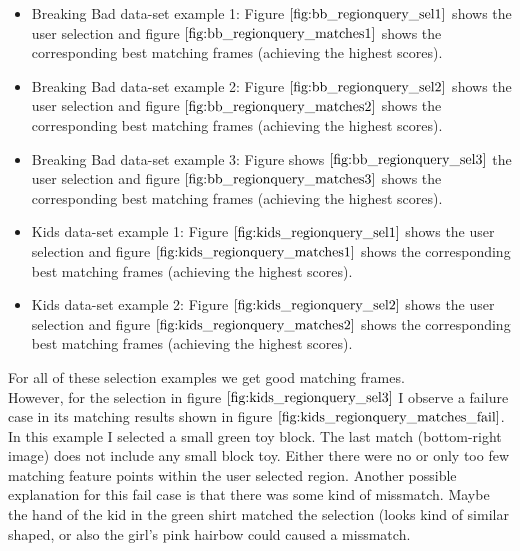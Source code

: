 \documentclass{paper}
\begin{document}
\begin{itemize}
    \item Breaking Bad data-set example 1: Figure $\ref{fig:bb_regionquery_sel1}$ shows the user selection and figure $\ref{fig:bb_regionquery_matches1}$ shows the corresponding best matching frames (achieving the highest scores).
    \item Breaking Bad data-set example 2: Figure $\ref{fig:bb_regionquery_sel2}$ shows the user selection and figure $\ref{fig:bb_regionquery_matches2}$ shows the corresponding best matching frames (achieving the highest scores).
    \item Breaking Bad data-set example 3: Figure shows $\ref{fig:bb_regionquery_sel3}$ the user selection and figure $\ref{fig:bb_regionquery_matches3}$ shows the corresponding best matching frames (achieving the highest scores).
    \item Kids data-set example 1: Figure $\ref{fig:kids_regionquery_sel1}$ shows the user selection and figure $\ref{fig:kids_regionquery_matches1}$ shows the corresponding best matching frames (achieving the highest scores).
    \item Kids data-set example 2: Figure $\ref{fig:kids_regionquery_sel2}$ shows the user selection and figure $\ref{fig:kids_regionquery_matches2}$ shows the corresponding best matching frames (achieving the highest scores).     
\end{itemize}

For all of these selection examples we get good matching frames. \\

However, for the selection in figure $\ref{fig:kids_regionquery_sel3}$ I observe a failure case in its matching results shown in figure $\ref{fig:kids_regionquery_matches_fail}$. In this example I selected a small green toy block. The last match (bottom-right image) does not include any small block toy. Either there were no or only too few matching feature points within the user selected region. Another possible explanation for this fail case is that there was some kind of missmatch. Maybe  the hand of the kid in the green shirt matched the selection (looks kind of similar shaped, or also the girl's pink hairbow could caused a missmatch.
\end{document}
